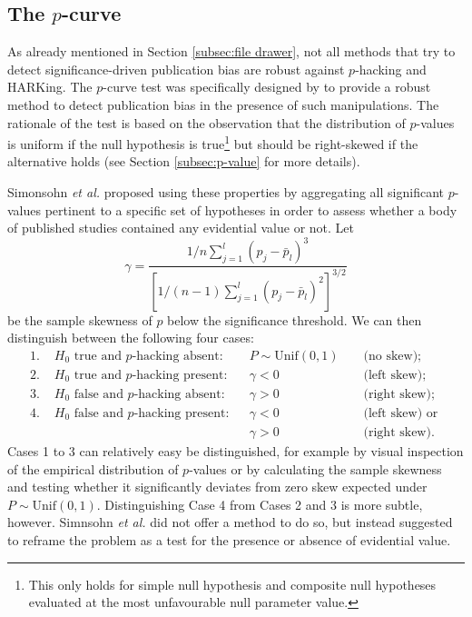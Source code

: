 \subsection{The \texorpdfstring{$p$}{p}-curve}
\label{subsec:p-curve}
As already mentioned in Section \ref{subsec:file drawer}, not all methods that try to detect significance-driven publication bias are robust against $p$-hacking and HARKing. The $p$-curve test was specifically designed by \citet{simonsohn_pcurve_detection_2014} to provide a robust method to detect publication bias in the presence of such manipulations. The rationale of the test is based on the observation that the distribution of $p$-values is uniform if the null hypothesis is true\footnote{This only holds for simple null hypothesis and composite null hypotheses evaluated at the most unfavourable null parameter value.} but should be right-skewed if the alternative holds (see Section \ref{subsec:p-value} for more details).\par
Simonsohn \textit{et al.} proposed using these properties by aggregating all significant $p$-values pertinent to a specific set of hypotheses in order to assess whether a body of published studies contained any evidential value or not. Let 
$${\gamma = \frac{1/n \sum_{j=1}^l (p_j-\bar{p}_l)^3}{[1/(n-1)\sum_{j=1}^l (p_j-\bar{p}_l)^2]^{3/2}}}$$ 
be the sample skewness of $p$ below the significance threshold. We can then distinguish between the following four cases:
\begin{align*}
    \text{1. } &H_0 \text{ true and $p$-hacking absent:} &&P \sim \text{Unif}(0,1) &&\text{ (no skew)};\\
    \text{2. } &H_0 \text{ true and $p$-hacking present:} &&\gamma < 0 &&\text{ (left skew)};\\
    \text{3. } &H_0 \text{ false and $p$-hacking absent:} &&\gamma > 0 &&\text{ (right skew)};\\
    \text{4. } &H_0 \text{ false and $p$-hacking present:} &&\gamma < 0 &&\text{ (left skew) or }\\ 
    & &&\gamma > 0 &&\text{ (right skew).}
\end{align*}
Cases 1 to 3 can relatively easy be distinguished, for example by visual inspection of the empirical distribution of $p$-values or by calculating the sample skewness and testing whether it significantly deviates from zero skew expected under $P \sim \text{Unif}(0,1)$. Distinguishing Case 4 from Cases 2 and 3 is more subtle, however. Simnsohn \textit{et al.} did not offer a method to do so, but instead suggested to reframe the problem as a test for the presence or absence of evidential value.\par
